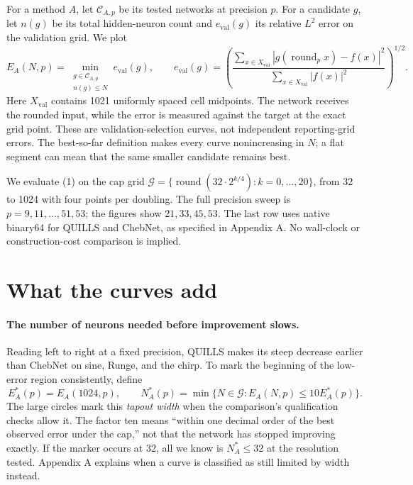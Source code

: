 \documentclass[11pt]{article}
\begin{document}
For a method \(A\), let \(\mathcal C_{A,p}\) be its tested networks at precision \(p\). For a candidate \(g\), let \(n(g)\) be its total hidden-neuron count and \(e_{\mathrm{val}}(g)\) its relative \(L^2\) error on the validation grid. We plot
\[
E_A(N,p)=\min_{\substack{g\in\mathcal C_{A,p}\\n(g)\le N}}e_{\mathrm{val}}(g),
\qquad
e_{\mathrm{val}}(g)=
\left(\frac{\sum_{x\in X_{\mathrm{val}}}|g(\operatorname{round}_p x)-f(x)|^2}
{\sum_{x\in X_{\mathrm{val}}}|f(x)|^2}\right)^{1/2}.
\tag{1}
\]
Here \(X_{\mathrm{val}}\) contains 1021 uniformly spaced cell midpoints. The network receives the rounded input, while the error is measured against the target at the exact grid point. These are validation-selection curves, not independent reporting-grid errors. The best-so-far definition makes every curve nonincreasing in \(N\); a flat segment can mean that the same smaller candidate remains best.

We evaluate (1) on the cap grid \(\mathcal G=\{\operatorname{round}(32\cdot2^{k/4}):k=0,\ldots,20\}\), from 32 to 1024 with four points per doubling. The full precision sweep is \(p=9,11,\ldots,51,53\); the figures show \(21,33,45,53\). The last row uses native binary64 for QUILLS and ChebNet, as specified in Appendix A. No wall-clock or construction-cost comparison is implied.

\section{What the curves add}

\paragraph{The number of neurons needed before improvement slows.}
Reading left to right at a fixed precision, QUILLS makes its steep decrease earlier than ChebNet on sine, Runge, and the chirp. To mark the beginning of the low-error region consistently, define
\[
E_A^*(p)=E_A(1024,p),\qquad
N_A^*(p)=\min\{N\in\mathcal G:E_A(N,p)\le 10E_A^*(p)\}.
\tag{2}
\]
The large circles mark this \emph{tapout width} when the comparison's qualification checks allow it. The factor ten means ``within one decimal order of the best observed error under the cap,'' not that the network has stopped improving exactly. If the marker occurs at 32, all we know is \(N_A^*\le32\) at the resolution tested. Appendix A explains when a curve is classified as still limited by width instead.
\end{document}
